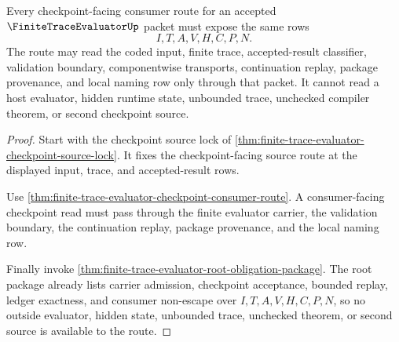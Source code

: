 \begin{theorem}
\label{thm:finite-trace-evaluator-checkpoint-route-totality}
Every checkpoint-facing consumer route for an accepted
$\FiniteTraceEvaluatorUp$ packet must expose the same rows
$$
I,T,A,V,H,C,P,N.
$$
The route may read the coded input, finite trace, accepted-result classifier,
validation boundary, componentwise transports, continuation replay, package
provenance, and local naming row only through that packet. It cannot read a
host evaluator, hidden runtime state, unbounded trace, unchecked compiler
theorem, or second checkpoint source.
\end{theorem}
\begin{proof}
Start with the checkpoint source lock of
\autoref{thm:finite-trace-evaluator-checkpoint-source-lock}. It fixes the
checkpoint-facing source route at the displayed input, trace, and
accepted-result rows.

Use \autoref{thm:finite-trace-evaluator-checkpoint-consumer-route}. A
consumer-facing checkpoint read must pass through the finite evaluator carrier,
the validation boundary, the continuation replay, package provenance, and the
local naming row.

Finally invoke
\autoref{thm:finite-trace-evaluator-root-obligation-package}. The root package
already lists carrier admission, checkpoint acceptance, bounded replay, ledger
exactness, and consumer non-escape over $I,T,A,V,H,C,P,N$, so no outside
evaluator, hidden state, unbounded trace, unchecked theorem, or second source
is available to the route.
\end{proof}


